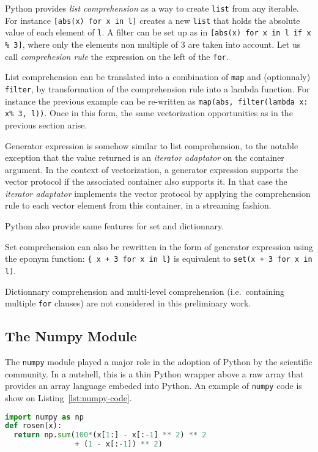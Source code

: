 \documentclass[preprint]{sigplanconf}
\begin{document}
Python provides \emph{list comprehension} as a way to create \texttt{list} from
any iterable. For instance \texttt{[abs(x) for x in l]} creates a new
\texttt{list} that holds the absolute value of each element of \texttt{l}. A
filter can be set up as in  \texttt{[abs(x) for x in l if x \% 3]}, where only
the elements non multiple of 3 are taken into account. Let us call
\emph{comprehesion rule} the expression on the left of the
\texttt{for}.

List comprehension can be translated into a combination of \texttt{map} and
(optionnaly) \texttt{filter}, by transformation of the comprehension rule into
a lambda function. For instance the previous example can be re-written as
\texttt{map(abs, filter(lambda x: x\% 3, l))}. Once in this form, the same
    vectorization opportunities as in the previous section arise.

Generator expression is somehow similar to list comprehension, to the notable
exception that the value returned is an \emph{iterator adaptator} on the
container argument. In the context of vectorization, a generator expression
supports the vector protocol if the associated container also supports it. In
that case the  \emph{iterator adaptator} implements the vector protocol by
applying the comprehension rule to each vector element from this container, in a
streaming fashion.

Python also provide same features for set and dictionnary.

Set comprehension can also be rewritten in the form of
generator expression using the eponym function: \texttt{\{ x + 3 for x in l\}}
is equivalent to \texttt{set(x + 3 for x in l)}.

Dictionnary comprehension and multi-level comprehension (i.e.\ containing
multiple \texttt{for} clauses) are not considered in this preliminary work.

\subsection{The Numpy Module}

The \texttt{numpy} module played a major role in the adoption of Python by the
scientific community. In a nutshell, this is a thin Python wrapper above a raw
array that provides an array language embeded into Python. An example of
\texttt{numpy} code is show on Listing~\ref{lst:numpy-code}.

\begin{lstlisting}[language=python, label={lst:numpy-code}, caption={Sample \texttt{numpy} code.}]
import numpy as np
def rosen(x):
  return np.sum(100*(x[1:] - x[:-1] ** 2) ** 2
                + (1 - x[:-1]) ** 2)
\end{lstlisting}
\end{document}

